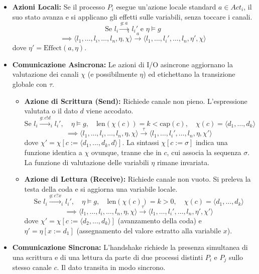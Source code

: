 \begin{itemize}
  \item \textbf{Azioni Locali:} Se il processo \(P_i\) esegue un'azione locale standard \(a \in Act_i\), il suo stato avanza e si applicano gli effetti sulle variabili, senza toccare i canali.
        \[ \text{Se } l_i \xrightarrow{g:a}_i l_i' \text{ e } \eta \models g \]
        \[ \implies \langle l_1, \dots, l_i, \dots, l_n, \eta, \chi \rangle \xrightarrow{a} \langle l_1, \dots, l_i', \dots, l_n, \eta', \chi \rangle \]
        dove \(\eta' = \text{Effect}(a, \eta)\).
  \item \textbf{Comunicazione Asincrona:} Le azioni di I/O asincrone aggiornano la valutazione dei canali \(\chi\) (e possibilmente \(\eta\)) ed etichettano la transizione globale con \(\tau\).
        \begin{itemize}
          \item \textbf{Azione di Scrittura (Send):} Richiede canale non pieno. L'espressione valutata o il dato \(d\) viene accodato.
                \[ \text{Se } l_i \xrightarrow{g:c!d}_i l_i', \quad \eta \models g, \quad \text{len}(\chi(c)) = k < \text{cap}(c), \quad \chi(c) = \langle d_1, \dots, d_k \rangle \]
                \[ \implies \langle l_1, \dots, l_i, \dots, l_n, \eta, \chi \rangle \xrightarrow{\tau} \langle l_1, \dots, l_i', \dots, l_n, \eta, \chi' \rangle \]
                dove \(\chi' = \chi[c := \langle d_1, \dots, d_k, d \rangle]\). La sintassi \(\chi[c := \sigma]\) indica una funzione identica a \(\chi\) ovunque, tranne che in \(c\), cui associa la sequenza \(\sigma\). La funzione di valutazione delle variabili \(\eta\) rimane invariata.

          \item \textbf{Azione di Lettura (Receive):} Richiede canale non vuoto. Si preleva la testa della coda e si aggiorna una variabile locale.
                \[ \text{Se } l_i \xrightarrow{g:c?x}_i l_i', \quad \eta \models g, \quad \text{len}(\chi(c)) = k > 0, \quad \chi(c) = \langle d_1, \dots, d_k \rangle \]
                \[ \implies \langle l_1, \dots, l_i, \dots, l_n, \eta, \chi \rangle \xrightarrow{\tau} \langle l_1, \dots, l_i', \dots, l_n, \eta', \chi' \rangle \]
                dove \(\chi' = \chi[c := \langle d_2, \dots, d_k \rangle]\) (avanzamento della coda) e \(\eta' = \eta[x := d_1]\) (assegnamento del valore estratto alla variabile \(x\)).
        \end{itemize}
  \item \textbf{Comunicazione Sincrona:} L'handshake richiede la presenza simultanea di una scrittura e di una lettura da parte di due processi distinti \(P_i\) e \(P_j\) sullo stesso canale \(c\). Il dato transita in modo sincrono.


\end{itemize}
